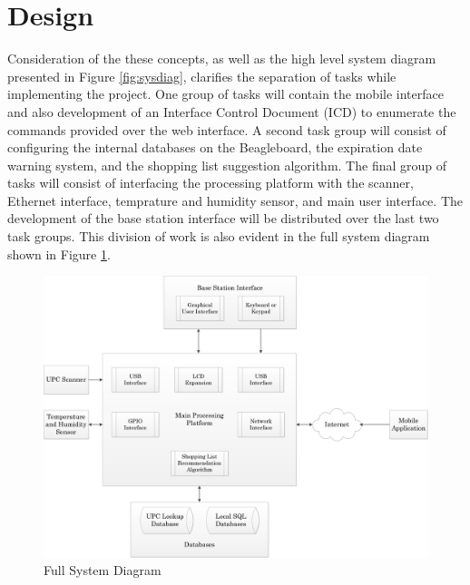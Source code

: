 \documentclass[11pt]{article} %
\begin{document}
\section{Design}
Consideration of the these concepts, as well as the high level system diagram presented in Figure \ref{fig:sysdiag}, clarifies the separation of tasks while implementing the project. One group of tasks will contain the mobile interface and also development of an Interface Control Document (ICD) to enumerate the commands provided over the web interface. A second task group will consist of configuring the internal databases on the Beagleboard, the expiration date warning system, and the shopping list suggestion algorithm. The final group of tasks will consist of interfacing the processing platform with the scanner, Ethernet interface, temprature and humidity sensor, and main user interface. The development of the base station interface will be distributed over the last two task groups. This division of work is also evident in the full system diagram shown in Figure \ref{fig:fullsys}.
\begin{figure}[h!]
\vspace{0.5cm}
\begin{center}
\includegraphics[scale=0.5]{../Graphics/FullSystemDiagram}
\caption{Full System Diagram}
\label{fig:fullsys}
\end{center}
\end{figure}
\end{document}
